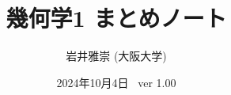 \documentclass[dvipdfmx,a4paper,11pt]{article}
\title{幾何学1 まとめノート}
\author{岩井雅崇 (大阪大学)}
\date{2024年10月4日 \, ver 1.00}
\newcommand{\R}{\mathbb{R}}
\theoremstyle{definition}
\newtheorem{dfn}[thm]{定義}
\begin{document}
\maketitle
\tableofcontents
\newpage


\begin{comment}
\begin{center}
{\Large 1-4. 多様体の復習・多様体の例・接ベクトル空間}
\end{center}
\begin{flushright}
 岩井雅崇 2022/10/07
\end{flushright}


\vspace{22pt}


\begin{tcolorbox}[
    colback = white,
    colframe = green!35!black,
    fonttitle = \bfseries,
    breakable = true]
    \begin{dfn}[多様体の定義]
    $r$を1以上の自然数または$\infty$とする. 位相空間$M$が次の条件を満たすとき, $C^r$級微分可能多様体と呼ぶ
    \begin{enumerate}
    \item $M$はハウスドルフ空間である.
    \item $M$は$m$次元の座標近傍$\{ (U_{\alpha}, \varphi_{\alpha})\}_{\alpha \in A}$で被覆される.
     ここで$(U_{\alpha}, \varphi_{\alpha})$が$m$次元の座標近傍であるとは, ある$\R^m$の開集合$U'_{\alpha}$があって$\varphi_{\alpha} : U_{\alpha} \rightarrow U'_{\alpha}$は同相写像である.
     \item $U_{\alpha} \cap U_{\beta} = \varnothing$なる$\alpha, \beta \in A$について
     $$
     \varphi_{\beta}: \circ \varphi_{\alpha}: \varphi_{\alpha}(U_{\alpha}\cap U_{\beta})
     \rightarrow  \varphi_{\beta}(U_{\alpha}\cap U_{\beta})
     $$
     は$C^r$級写像である.
       \end{enumerate}

    \end{dfn}
    \end{tcolorbox}

\begin{tcolorbox}[
    colback = white,
    colframe = green!35!black,
    fonttitle = \bfseries,
    breakable = true]
    \begin{dfn}[接ベクトル空間]
$M$を$C^1$級多様体とし, $(x_1, \ldots, x_m)$を点$p \in M$の局所座標系とする. 
$h$


\end{comment}
\end{document}
